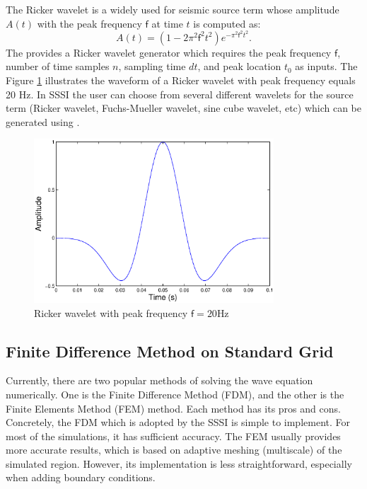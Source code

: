 \documentclass[11pt]{article}
\newcommand{\sff}{\mathsf{f}}
\theoremstyle{plain}
\theoremstyle{definition}
\theoremstyle{remark}
\numberwithin{equation}{section}
\begin{document}
The Ricker wavelet is a widely used for seismic source term whose amplitude $A(t)$ with the peak frequency $\sff$ at time $t$ is computed as:
\begin{equation}
A(t)=(1-2\pi^2 \sff^2 t^2)e^{-\pi^2 \sff^2 t^2}.
\end{equation}
The  provides a Ricker wavelet generator which requires the peak frequency $\sff$, number of time samples $n$, 
sampling time $dt$, and peak location $t_0$ as inputs. The Figure \ref{fig:ricker} illustrates the waveform of a Ricker wavelet with peak frequency equals 20 Hz. In SSSI the user can choose from several different wavelets for the source term (Ricker wavelet, Fuchs-Mueller wavelet, sine cube wavelet, etc) which can be generated using .

\begin{figure}[htbp]
\centering
\includegraphics[width=0.8\textwidth]{Fig/ricker}
\caption{Ricker wavelet with peak frequency $\sff=20$Hz}
\label{fig:ricker}
\end{figure}


\subsection{Finite Difference Method on Standard Grid}
Currently, there are two popular methods of solving the wave equation numerically. One is the Finite Difference Method (FDM), and the other is the Finite Elements Method (FEM) method. Each method has its pros and cons. Concretely, the FDM which is adopted by the SSSI is simple to implement. For most of the simulations, it has sufficient accuracy. The FEM usually provides more accurate results, which is based on adaptive meshing (multiscale) of the simulated region. However, its implementation is less straightforward, especially when adding boundary conditions.   
\end{document}
